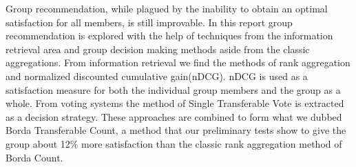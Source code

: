 Group recommendation, while plagued by the inability to obtain an optimal satisfaction for all members, is still improvable. In this report group recommendation is explored with the help of techniques from the information retrieval area and group decision making methods aside from the classic aggregations. From information retrieval we find the methods of rank aggregation and normalized discounted cumulative gain(nDCG). nDCG is used as a satisfaction measure for both the individual group members and the group as a whole. From voting systems the method of Single Transferable Vote is extracted as a decision strategy. These approaches are combined to form what we dubbed Borda Transferable Count, a method that our preliminary tests show to give the group about 12\% more satisfaction than the classic rank aggregation method of Borda Count.